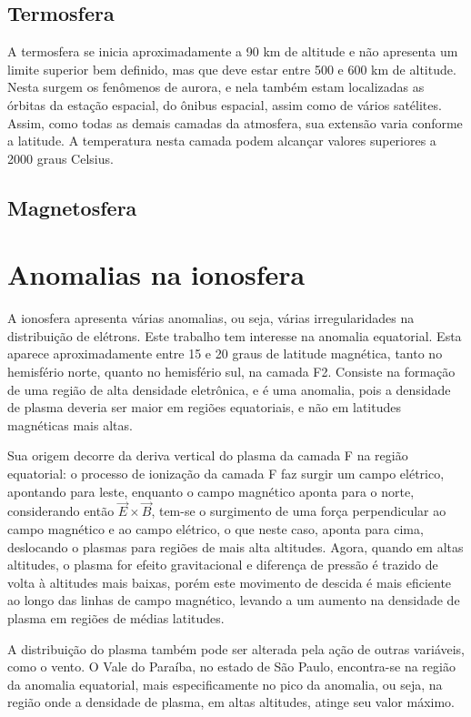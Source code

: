 \subsection{Termosfera}

A termosfera se inicia aproximadamente a 90 km de altitude e não apresenta um limite superior bem definido, mas que deve estar entre 500 e 600 km de altitude. Nesta surgem os fenômenos de aurora, e nela também estam localizadas as órbitas da estação espacial, do ônibus espacial, assim como de vários satélites. Assim, como todas as demais camadas da atmosfera, sua extensão varia conforme a latitude. A temperatura nesta camada podem alcançar valores superiores a 2000 graus Celsius.

\subsection{Magnetosfera}

\section{Anomalias na ionosfera}

A ionosfera apresenta várias anomalias, ou seja, várias irregularidades na distribuição de elétrons. Este trabalho tem interesse na anomalia equatorial. Esta aparece aproximadamente entre 15 e 20 graus de latitude magnética, tanto no hemisfério norte, quanto no hemisfério sul, na camada F2. Consiste na formação de uma região de alta densidade eletrônica, e é uma anomalia, pois a densidade de plasma deveria ser maior em regiões equatoriais, e não em latitudes magnéticas mais altas.

Sua origem decorre da deriva vertical do plasma da camada F na região equatorial: o processo de ionização da camada F faz surgir um campo elétrico, apontando para leste, enquanto o campo magnético aponta para o norte, considerando então $\vec{E}\times\vec{B}$, tem-se o surgimento de uma força perpendicular ao campo magnético e ao campo elétrico, o que neste caso, aponta para cima, deslocando o plasmas para regiões de mais alta altitudes. Agora, quando em altas altitudes, o plasma for efeito gravitacional e diferença de pressão é trazido de volta à altitudes mais baixas, porém este movimento de descida é mais eficiente ao longo das linhas de campo magnético, levando a um aumento na densidade de plasma em regiões de médias latitudes. 

A distribuição do plasma também pode ser alterada pela ação de outras variáveis, como o vento. O Vale do Paraíba, no estado de São Paulo, encontra-se na região da anomalia equatorial, mais especificamente no pico da anomalia, ou seja, na região onde a densidade de plasma, em altas altitudes, atinge seu valor máximo.

